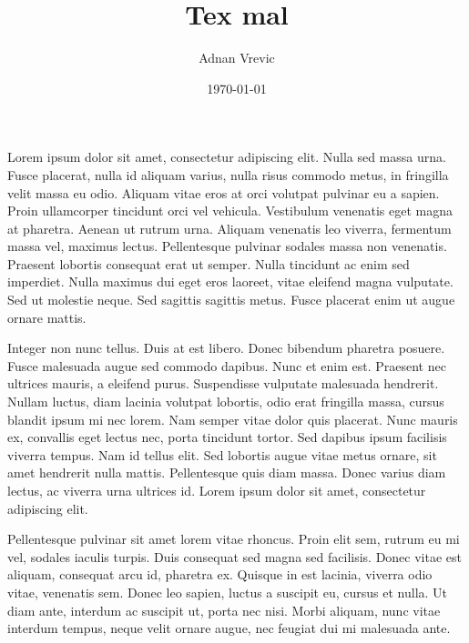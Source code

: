 \documentclass[norsk,a4paper,12pt]{article}
\title{Tex mal}
\author{Adnan Vrevic}
\date{\today}
\begin{document}
\maketitle



Lorem ipsum dolor sit amet, consectetur adipiscing elit. Nulla sed massa urna. Fusce placerat, nulla id aliquam varius, nulla risus commodo metus, in fringilla velit massa eu odio. Aliquam vitae eros at orci volutpat pulvinar eu a sapien. Proin ullamcorper tincidunt orci vel vehicula. Vestibulum venenatis eget magna at pharetra. Aenean ut rutrum urna. Aliquam venenatis leo viverra, fermentum massa vel, maximus lectus. Pellentesque pulvinar sodales massa non venenatis. Praesent lobortis consequat erat ut semper. Nulla tincidunt ac enim sed imperdiet. Nulla maximus dui eget eros laoreet, vitae eleifend magna vulputate. Sed ut molestie neque. Sed sagittis sagittis metus. Fusce placerat enim ut augue ornare mattis.

Integer non nunc tellus. Duis at est libero. Donec bibendum pharetra posuere. Fusce malesuada augue sed commodo dapibus. Nunc et enim est. Praesent nec ultrices mauris, a eleifend purus. Suspendisse vulputate malesuada hendrerit. Nullam luctus, diam lacinia volutpat lobortis, odio erat fringilla massa, cursus blandit ipsum mi nec lorem. Nam semper vitae dolor quis placerat. Nunc mauris ex, convallis eget lectus nec, porta tincidunt tortor. Sed dapibus ipsum facilisis viverra tempus. Nam id tellus elit. Sed lobortis augue vitae metus ornare, sit amet hendrerit nulla mattis. Pellentesque quis diam massa. Donec varius diam lectus, ac viverra urna ultrices id. Lorem ipsum dolor sit amet, consectetur adipiscing elit.

Pellentesque pulvinar sit amet lorem vitae rhoncus. Proin elit sem, rutrum eu mi vel, sodales iaculis turpis. Duis consequat sed magna sed facilisis. Donec vitae est aliquam, consequat arcu id, pharetra ex. Quisque in est lacinia, viverra odio vitae, venenatis sem. Donec leo sapien, luctus a suscipit eu, cursus et nulla. Ut diam ante, interdum ac suscipit ut, porta nec nisi. Morbi aliquam, nunc vitae interdum tempus, neque velit ornare augue, nec feugiat dui mi malesuada ante. 
\end{document}
